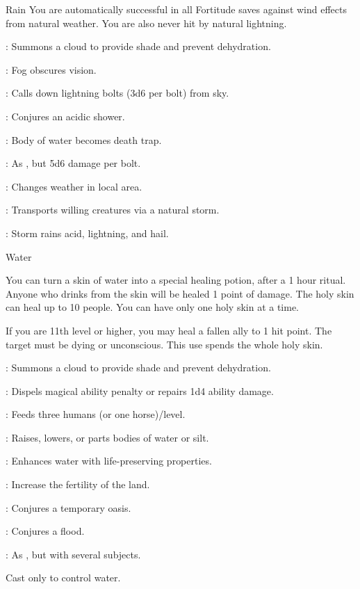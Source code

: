 {Rain}
{You are automatically successful in all Fortitude saves against wind effects from natural weather. You are also never hit by natural lightning.}
{
	\item {}: Summons a cloud to provide shade and prevent dehydration.
	\item {}: Fog obscures vision.
	\item {}: Calls down lightning bolts (3d6 per bolt) from sky.
	\item {}: Conjures an acidic shower.
	\item {}: Body of water becomes death trap.
	\item {}: As , but 5d6 damage per bolt.
	\item {}: Changes weather in local area.
	\item {}: Transports willing creatures via a natural storm.
	\item {}: Storm rains acid, lightning, and hail.
}

{Water}
{You can turn a skin of water into a special healing potion, after a 1 hour ritual. Anyone who drinks from the skin will be healed 1 point of damage. The holy skin can heal up to 10 people. You can have only one holy skin at a time.

If you are 11th level or higher, you may heal a fallen ally to 1 hit point. The target must be dying or unconscious. This use spends the whole holy skin. }
{
	\item {}: Summons a cloud to provide shade and prevent dehydration.
	\item {}: Dispels magical ability penalty or repairs 1d4 ability damage.
	\item {}: Feeds three humans (or one horse)/level.
	\item {}\footnotemark[1]: Raises, lowers, or parts bodies of water or silt.
	\item {}: Enhances water with life-preserving properties.
	\item {}: Increase the fertility of the land.
	\item {}: Conjures a temporary oasis.
	\item {}: Conjures a flood.
	\item {}: As , but with several subjects.
}
 Cast only to control water.

